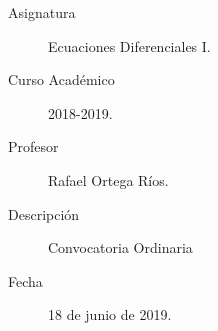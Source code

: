 \documentclass[12pt]{article}
\begin{document}

    
    

    \begin{description}
        \item[Asignatura] Ecuaciones Diferenciales I.
        \item[Curso Académico] 2018-2019.
        \item[Profesor] Rafael Ortega Ríos.
        \item[Descripción] Convocatoria Ordinaria
        \item[Fecha] 18 de junio de 2019.
    
    \end{description}
    \newpage
\end{document}
